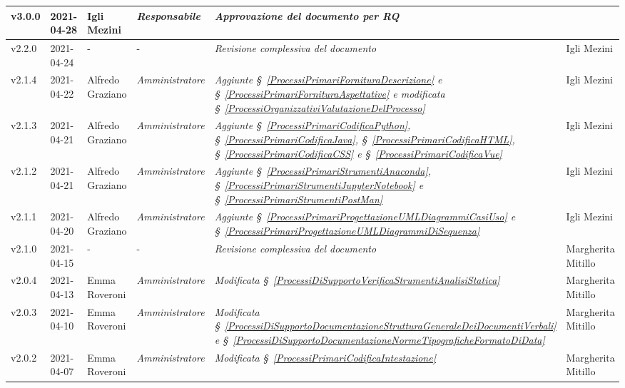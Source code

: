 {\begin{center}
\begin{longtable}[c]{|p{2cm-1\tabcolsep}|p{2cm}|p{3cm-2\tabcolsep}|p{3cm-1.5\tabcolsep}|p{}|p{3cm-2\tabcolsep}|}
		\hline
		\centering v3.0.0 & 2021-04-28 & \centering Igli Mezini & \centering \textit{Responsabile}  & \textit{Approvazione del documento per RQ} & \makecell[c]{-}\\
		\hline
		\centering v2.2.0 & 2021-04-24 & \centering - & \centering -  & \textit{Revisione complessiva del documento} & Igli Mezini \\
		\hline
		\centering v2.1.4 & 2021-04-22 & Alfredo Graziano & \centering \textit{Amministratore}  & \textit{Aggiunte \S~\ref{ProcessiPrimariFornituraDescrizione} e \S~\ref{ProcessiPrimariFornituraAspettative} e modificata \S~\ref{ProcessiOrganizzativiValutazioneDelProcesso} } & Igli Mezini\\
		\hline
		\centering v2.1.3 & 2021-04-21 & Alfredo Graziano & \centering \textit{Amministratore}  & \textit{Aggiunte \S~\ref{ProcessiPrimariCodificaPython},  \S~\ref{ProcessiPrimariCodificaJava}, \S~\ref{ProcessiPrimariCodificaHTML}, \S~\ref{ProcessiPrimariCodificaCSS} e \S~\ref{ProcessiPrimariCodificaVue}} & Igli Mezini \\
		\hline
		\centering v2.1.2 & 2021-04-21 & Alfredo Graziano & \centering \textit{Amministratore}  & \textit{Aggiunte \S~\ref{ProcessiPrimariStrumentiAnaconda}, \S~\ref{ProcessiPrimariStrumentiJupyterNotebook} e \S~\ref{ProcessiPrimariStrumentiPostMan}} & Igli Mezini \\
		\hline
		\centering v2.1.1 & 2021-04-20 &Alfredo Graziano & \centering \textit{Amministratore}  & \textit{Aggiunte \S~\ref{ProcessiPrimariProgettazioneUMLDiagrammiCasiUso} e \S~\ref{ProcessiPrimariProgettazioneUMLDiagrammiDiSequenza} } &   Igli Mezini\\
		\hline
		\centering v2.1.0 & 2021-04-15 & \centering - & \centering -  & \textit{Revisione complessiva del documento} & Margherita Mitillo \\
		\hline
		\centering v2.0.4 & 2021-04-13 & Emma Roveroni & \centering \textit{Amministratore}  & \textit{Modificata \S~\ref{ProcessiDiSupportoVerificaStrumentiAnalisiStatica}} & Margherita Mitillo \\
		\hline
		\centering v2.0.3 & 2021-04-10 & Emma Roveroni & \centering \textit{Amministratore} & \textit{Modificata \S~\ref{ProcessiDiSupportoDocumentazioneStrutturaGeneraleDeiDocumentiVerbali} e \S~\ref{ProcessiDiSupportoDocumentazioneNormeTipograficheFormatoDiData} } & Margherita Mitillo  \\
		\hline
		\centering v2.0.2 & 2021-04-07 & Emma Roveroni & \centering \textit{Amministratore}  & \textit{Modificata \S~\ref{ProcessiPrimariCodificaIntestazione}} & Margherita Mitillo \\

\end{longtable}
\end{center}}

